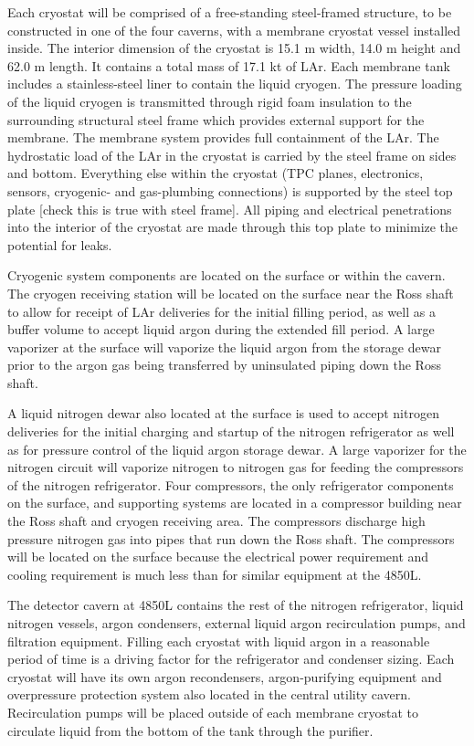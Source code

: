 Each cryostat will be comprised of a free-standing steel-framed structure, to be constructed in one of the four caverns, with a membrane cryostat vessel installed inside. The interior dimension of the cryostat is 15.1 m width, 14.0 m height and 62.0 m length. It contains a total mass of 17.1 kt of LAr. Each membrane tank includes a stainless-steel liner to contain the liquid cryogen. The pressure loading of the liquid cryogen is transmitted through rigid foam insulation to the surrounding structural steel frame which provides external support for the membrane. The membrane system provides full containment of the LAr. The hydrostatic load of the LAr in the cryostat is carried by the steel frame on sides and bottom. Everything else within the cryostat (TPC planes, electronics, sensors, cryogenic- and gas-plumbing connections) is supported by the steel top plate [check this is true with steel frame]. All piping and electrical penetrations into the interior of the cryostat are made through this top plate to minimize the potential for leaks.

Cryogenic system components are located on the surface or within the cavern. The cryogen receiving station will be located on the surface near the Ross shaft to allow for receipt of LAr deliveries for the initial filling period, as well as a buffer volume to accept liquid argon during the extended fill period. A large vaporizer at the surface will vaporize the liquid argon from the storage dewar prior to the argon gas being transferred by uninsulated piping down the Ross shaft. 

A liquid nitrogen dewar also located at the surface is used to accept nitrogen deliveries for the initial charging and startup of the nitrogen refrigerator as well as for pressure control of the liquid argon storage dewar. A large vaporizer for the nitrogen circuit will vaporize nitrogen to nitrogen gas for feeding the compressors of the nitrogen refrigerator. Four compressors, the only refrigerator components on the surface, and supporting systems are located in a compressor building near the Ross shaft and cryogen receiving area. The compressors discharge high pressure nitrogen gas into pipes that run down the Ross shaft. The compressors will be located on the surface because the electrical power requirement and cooling requirement is much less than for similar equipment at the 4850L.  

The detector cavern at 4850L contains the rest of the nitrogen refrigerator, liquid nitrogen vessels, argon condensers, external liquid argon recirculation pumps, and filtration equipment. Filling each cryostat with liquid argon in a reasonable period of time is a driving factor for the refrigerator and condenser sizing.  Each cryostat will have its own argon recondensers, argon-purifying equipment and overpressure protection system also located in the central utility cavern. Recirculation pumps will be placed outside of each membrane cryostat to circulate liquid from the bottom of the tank through the purifier.



